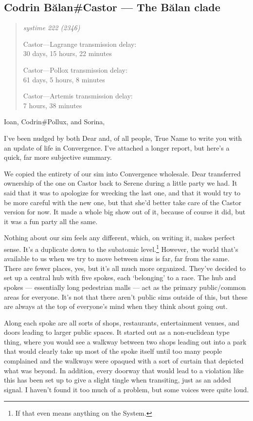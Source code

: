 \hypertarget{codrin-bux103lancastor-the-bux103lan-clade}{%
\subsection{Codrin Bălan\#Castor — The Bălan clade}\label{codrin-bux103lancastor-the-bux103lan-clade}}

\begin{quote}
\itshape
systime 222 (2346)

Castor---Lagrange transmission delay:\\
30 days, 15 hours, 22 minutes

Castor---Pollox transmission delay:\\
61 days, 5 hours, 8 minutes

Castor---Artemis transmission delay:\\
7 hours, 38 minutes
\end{quote}

Ioan, Codrin\#Pollux, and Sorina,

I've been nudged by both Dear and, of all people, True Name to write you with an update of life in Convergence. I've attached a longer report, but here's a quick, far more subjective summary.

We copied the entirety of our sim into Convergence wholesale. Dear transferred ownership of the one on Castor back to Serene during a little party we had. It said that it was to apologize for wrecking the last one, and that it would try to be more careful with the new one, but that she'd better take care of the Castor version for now. It made a whole big show out of it, because of course it did, but it was a fun party all the same.

Nothing about our sim feels any different, which, on writing it, makes perfect sense. It's a duplicate down to the subatomic level.\footnote{If that even means anything on the System.} However, the world that's available to us when we try to move between sims is far, far from the same. There are fewer places, yes, but it's all much more organized. They've decided to set up a central hub with five spokes, each `belonging' to a race. The hub and spokes — essentially long pedestrian malls — act as the primary public/common areas for everyone. It's not that there aren't public sims outside of this, but these are always at the top of everyone's mind when they think about going out.

Along each spoke are all sorts of shops, restaurants, entertainment venues, and doors leading to larger public spaces. It started out as a non-euclidean type thing, where you would see a walkway between two shops leading out into a park that would clearly take up most of the spoke itself until too many people complained and the walkways were opaqued with a sort of curtain that depicted what was beyond. In addition, every doorway that would lead to a violation like this has been set up to give a slight tingle when transiting, just as an added signal. I haven't found it too much of a problem, but some voices were quite loud.

